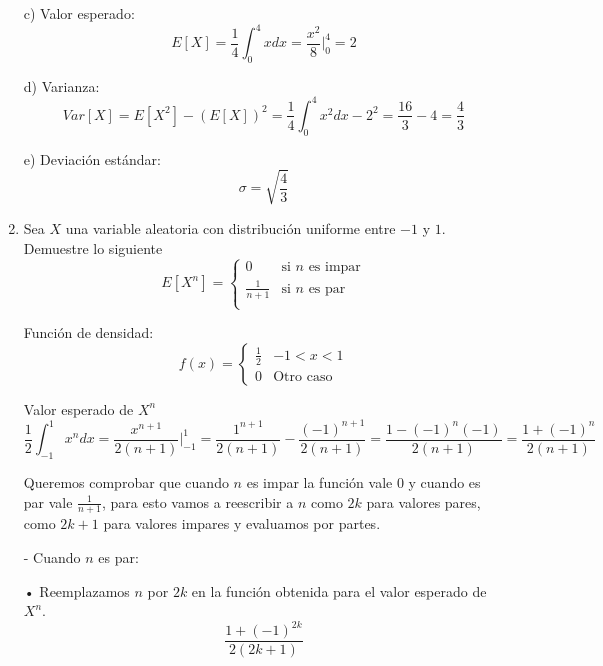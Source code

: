 \documentclass[a4paper, 12pt]{article}
\newcommand{\Aspace}{0.2cm}
\begin{document}
\begin{enumerate}
{                c) Valor esperado:
                \[
                    E[X] = \frac{1}{4} \int_{0}^{4}xdx = \frac{x^{2}}{8}\Big|_{0}^{4} = 2
                \]

                d) Varianza:
                \[
                    Var[X] = E[X^{2}] - (E[X])^{2} 
                    = \frac{1}{4} \int_{0}^{4} x^{2}dx - 2^{2} 
                    = \frac{16}{3} - 4 
                    = \frac{4}{3}
                \]

                e) Deviación estándar:
                \[
                    \sigma = \sqrt{\frac{4}{3}}
                \]
            }

        \newpage
        \item Sea $X$ una variable aleatoria con distribución uniforme entre $-1$ y $1$. Demuestre lo siguiente
        \[
            E[X^{n}] =
            \begin{cases}
                0 & \text{si $n$ es impar}  \\
                \frac{1}{n + 1} & \text{si $n$ es par} \\
            \end{cases}
        \]
            \vspace{\Aspace} \par
            { \color{azul} 
                Función de densidad:
                \[
                    f(x) =
                    \begin{cases}
                        \frac{1}{2} &   -1 < x < 1 \\
                        0           &   \text{Otro caso}
                    \end{cases}
                \]

                Valor esperado de $X^{n}$
                \[
                    \frac{1}{2} \int_{-1}^{1} x^{n}dx
                    = \frac{x^{n + 1}}{2(n + 1)} \Big|_{-1}^{1}
                    = \frac{1^{n + 1}}{2(n + 1)} - \frac{(-1)^{n + 1}}{2(n + 1)}
                    = \frac{1 - (-1)^{n}(-1)}{2(n + 1)}
                    = \frac{1 + (-1)^{n}}{2(n + 1)}
                \]

                Queremos comprobar que cuando $n$ es impar la función vale 0 y cuando es par vale $\frac{1}{n + 1}$, para esto vamos a reescribir a $n$ como $2k$ para valores pares, como $2k + 1$ para valores impares y evaluamos por partes. \par
                - Cuando $n$ es par: \par
                • Reemplazamos $n$ por $2k$ en la función obtenida para el valor esperado de $X^{n}$.
                \[ \frac{1 + (-1)^{2k}}{2(2k + 1)} \]

}
\end{enumerate}
\end{document}
